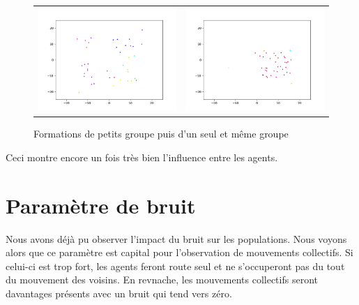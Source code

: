 \documentclass[french, a4paper, 12pt, openany]{report}
\begin{document}
   \begin{figure}[!h]
		\centering
		\begin{tabular}{cc}
			\includegraphics[width=10cm]{images/image_7.png} & \includegraphics[width=10cm]{images/image_9.png} \\
		\end{tabular}
		\caption{Formations de petits groupe puis d'un seul et même groupe}
	\end{figure} 
	
	Ceci montre encore un fois très bien l'influence entre les agents.
\newpage
\section{Paramètre de bruit}
   
   
   Nous avons déjà pu observer l'impact du bruit sur les populations. Nous voyons alors que ce paramètre est capital pour l'observation de mouvements collectifs. Si celui-ci est trop fort, les agents feront route seul et ne s'occuperont pas du tout du mouvement des voisins. En revnache, les mouvements collectifs seront davantages présents avec un bruit qui tend vers zéro.
\end{document}
